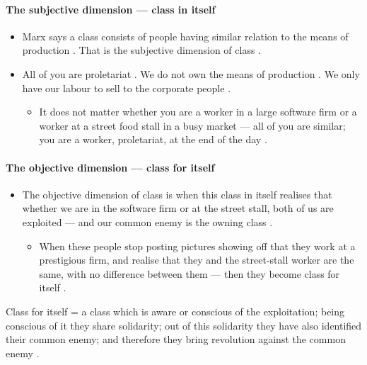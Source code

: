 \paragraph{The subjective dimension --- class in itself}
\begin{itemize}
    \item Marx says a class consists of people having similar relation to the means of production . That is the subjective dimension of class .
    \item All of you are proletariat . We do not own the means of production . We only have our labour to sell to the corporate people .
    \begin{itemize}
        \item It does not matter whether you are a worker in a large software firm or a worker at a street food stall in a busy market --- all of you are similar; you are a worker, proletariat, at the end of the day .
    \end{itemize}
\end{itemize}

\paragraph{The objective dimension --- class for itself}
\begin{itemize}
    \item The objective dimension of class is when this class in itself realises that whether we are in the software firm or at the street stall, both of us are exploited --- and our common enemy is the owning class .
    \begin{itemize}
        \item When these people stop posting pictures showing off that they work at a prestigious firm, and realise that they and the street-stall worker are the same, with no difference between them --- then they become class for itself .
    \end{itemize}
\end{itemize}

\begin{KeyConcept}
Class for itself = a class which is aware or conscious of the exploitation; being conscious of it they share solidarity; out of this solidarity they have also identified their common enemy; and therefore they bring revolution against the common enemy .
\end{KeyConcept}

